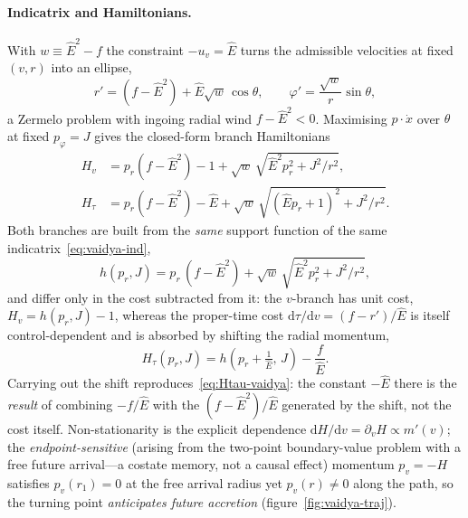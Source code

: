\documentclass[12pt]{iopart}
\newcommand{\Ehat}{\hat E}
\newcommand{\dd}{\mathrm{d}}
\theoremstyle{plain}
\theoremstyle{definition}
\theoremstyle{plain}
\theoremstyle{remark}
\begin{document}
\paragraph{Indicatrix and Hamiltonians.} With $w\equiv\Ehat^2-f$ the constraint
$-u_v=\Ehat$ turns the admissible velocities at fixed $(v,r)$ into an ellipse,
\begin{equation}
    r'=(f-\Ehat^2)+\Ehat\sqrt w\,\cos\theta,\qquad
    \varphi'=\frac{\sqrt w}{r}\sin\theta,
    \label{eq:vaidya-ind}
\end{equation}
a Zermelo problem with ingoing radial wind $f-\Ehat^2<0$. Maximising
$p\cdot\dot x$ over $\theta$ at fixed $p_\varphi=J$ gives the closed-form branch
Hamiltonians
\begin{align}
    H_v&=p_r(f-\Ehat^2)-1+\sqrt w\,\sqrt{\Ehat^2 p_r^2+J^2/r^2},
    \label{eq:Hv}\\
    H_\tau&=p_r(f-\Ehat^2)-\Ehat
        +\sqrt w\,\sqrt{(\Ehat p_r+1)^2+J^2/r^2}.
    \label{eq:Htau-vaidya}
\end{align}
Both branches are built from the \emph{same} support function of the same
indicatrix~\eqref{eq:vaidya-ind},
\begin{equation}
   h(p_r,J)=p_r\,(f-\Ehat^2)+\sqrt w\,\sqrt{\Ehat^2p_r^2+J^2/r^2},
   \label{eq:vaidya-support}
\end{equation}
and differ only in the cost subtracted from it: the $v$-branch has unit cost,
$H_v=h(p_r,J)-1$, whereas the proper-time cost $\dd\tau/\dd v=(f-r')/\Ehat$ is itself
control-dependent and is absorbed by shifting the radial momentum,
\begin{equation}
   H_\tau(p_r,J)=h\!\left(p_r+\tfrac1{\Ehat},\,J\right)-\frac{f}{\Ehat} .
   \label{eq:tau-from-v}
\end{equation}
Carrying out the shift reproduces~\eqref{eq:Htau-vaidya}: the constant $-\Ehat$ there is
the \emph{result} of combining $-f/\Ehat$ with the $(f-\Ehat^2)/\Ehat$ generated by the
shift, not the cost itself. Non-stationarity is the explicit dependence
$\dd H/\dd v=\partial_v H\propto m'(v)$; the \emph{endpoint-sensitive} (arising from the
two-point boundary-value problem with a free future arrival---a costate memory, not a
causal effect) momentum $p_v=-H$
satisfies $p_v(r_1)=0$ at the free arrival radius yet $p_v(r)\neq0$ along the
path, so the turning point \emph{anticipates future accretion}
(figure~\ref{fig:vaidya-traj}).
\end{document}
